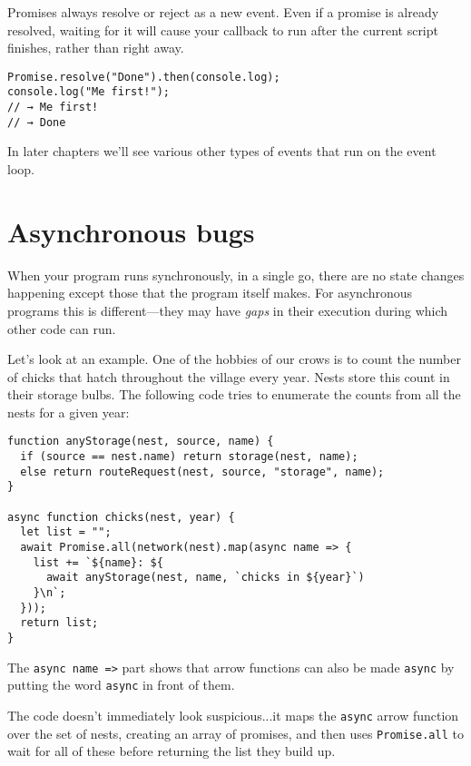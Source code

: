 Promises always resolve or reject as a new event. Even if a promise is already resolved, waiting for it will cause your callback to run after the current script finishes, rather than right away.

\begin{lstlisting}
Promise.resolve("Done").then(console.log);
console.log("Me first!");
// → Me first!
// → Done
\end{lstlisting}
\noindent

In later chapters we'll see various other types of events that run on the event loop.

\section{Asynchronous bugs}

When your program runs synchronously, in a single go, there are no state changes happening except those that the program itself makes. For asynchronous programs this is different—they may have \emph{gaps} in their execution during which other code can run.

Let's look at an example. One of the hobbies of our crows is to count the number of chicks that hatch throughout the village every year. Nests store this count in their storage bulbs. The following code tries to enumerate the counts from all the nests for a given year:

\begin{lstlisting}
function anyStorage(nest, source, name) {
  if (source == nest.name) return storage(nest, name);
  else return routeRequest(nest, source, "storage", name);
}

async function chicks(nest, year) {
  let list = "";
  await Promise.all(network(nest).map(async name => {
    list += `${name}: ${
      await anyStorage(nest, name, `chicks in ${year}`)
    }\n`;
  }));
  return list;
}
\end{lstlisting}
\noindent{}

The \lstinline`async name =>` part shows that arrow functions can also be made \lstinline`async` by putting the word \lstinline`async` in front of them.

The code doesn't immediately look suspicious...it maps the \lstinline`async` arrow function over the set of nests, creating an array of promises, and then uses \lstinline`Promise.all` to wait for all of these before returning the list they build up.


